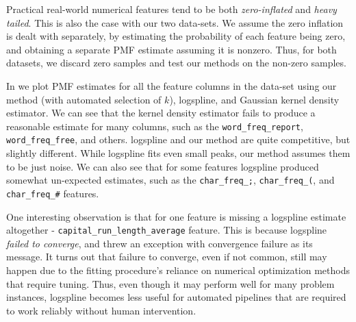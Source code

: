 \documentclass[10pt]{article} %
\begin{document}
Practical real-world numerical features tend to be both \emph{zero-inflated} and \emph{heavy tailed}. This is also the case with our two data-sets. We assume the zero inflation is dealt with separately, by estimating the probability of each feature being zero, and obtaining a separate PMF estimate assuming it is nonzero. Thus, for both datasets, we discard zero samples and test our methods on the non-zero samples.

In  we plot PMF estimates for all the feature columns in the data-set using our method (with automated selection of $k$), logspline, and Gaussian kernel density estimator. We can see that the kernel density estimator fails to produce a reasonable estimate for many columns, such as the \texttt{word\_freq\_report},  \texttt{word\_freq\_free}, and others. logspline and our method are quite competitive, but slightly different. While logspline fits even small peaks, our method assumes them to be just noise. We can also see that for some features logspline produced somewhat un-expected estimates, such as the \texttt{char\_freq\_;}, \texttt{char\_freq\_(}, and \texttt{char\_freq\_\#} features. 

One interesting observation is that for  one feature is missing a logspline estimate altogether -  \texttt{capital\_run\_length\_average} feature. This is because logspline \emph{failed to converge}, and threw an exception with convergence failure as its message. It turns out that failure to converge, even if not common, still may happen due to the fitting procedure's reliance on numerical optimization methods that require tuning. Thus, even though it may perform well for many problem instances, logspline becomes less useful for automated pipelines that are required to work reliably without human intervention.
\end{document}
